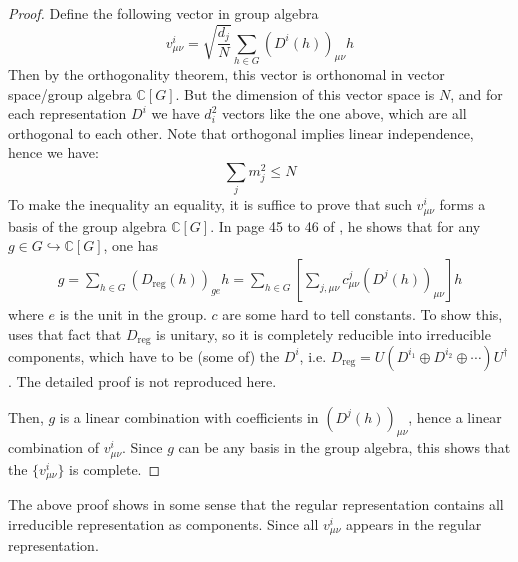 \begin{proof}
    Define the following vector in group algebra
    \begin{equation}
        v^{i}_{\mu\nu} = \sqrt{\frac{d_j}{N}} \sum_{h\in G}
        \left(D^i(h)\right)_{\mu\nu} h
    \end{equation}
    Then by the orthogonality theorem, this vector is orthonomal in
    vector space/group algebra $\mathbb{C}[G]$. But the dimension of
    this vector space is $N$, and for each representation $D^i$ we
    have $d_i^2$ vectors like the one above, which are all orthogonal
    to each other. Note that orthogonal implies linear independence,
    hence we have:
        $$\sum_{j} m_j^2 \leq N $$
    To make the inequality an equality, it is suffice to prove that
    such $v^{i}_{\mu\nu}$ forms a basis of the group algebra
    $\mathbb{C}[G]$. In page 45 to 46 of \cite{Ludeling}, he shows
    that for any $g\in G\hookrightarrow \mathbb{C}[G]$, one has
    \begin{align}
        g = \sum_{h\in G} \left(D_\text{reg}(h)\right)_{ge} h
        = \sum_{h\in G} \left[ \sum_{j,\mu\nu} c^j_{\mu\nu}
        \left(D^j(h)\right)_{\mu\nu}\right] h
    \end{align}
    where $e$ is the unit in the group. $c$ are some hard to tell
    constants. To show this, \cite{Ludeling} uses that fact that
    $D_\text{reg}$ is unitary, so it is completely reducible into
    irreducible components, which have to be (some of) the $D^i$,
    i.e. $D_\text{reg}= U(D^{i_1}\oplus D^{i_2}\oplus
    \cdots)U^\dagger$. The detailed proof is not reproduced here.

    Then, $g$ is a linear combination with
    coefficients in $\left(D^j(h)\right)_{\mu\nu}$, hence a linear
    combination of $v^i_{\mu\nu}$. Since $g$ can be any basis in the
    group algebra, this shows that the $\{v^i_{\mu\nu}\}$ is complete.
\end{proof}
\begin{remark}
    The above proof shows in some sense that the regular
    representation contains all irreducible representation as
    components. Since all $v^i_{\mu\nu}$ appears in the regular
    representation.
\end{remark}

